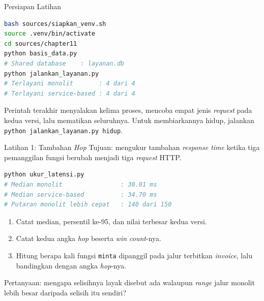 \documentclass[aspectratio=169, table, 12pt]{beamer}
\begin{document}
\begin{frame}[fragile]{{\Large Persiapan Latihan}}
  \vspace{5pt}
\begin{lstlisting}[language=bash]
bash sources/siapkan_venv.sh
source .venv/bin/activate
cd sources/chapter11
python basis_data.py
# Shared database    : layanan.db
python jalankan_layanan.py
# Terlayani monolit       : 4 dari 4
# Terlayani service-based : 4 dari 4
\end{lstlisting}

  \vspace{6pt}
  {\small Perintah terakhir menyalakan kelima proses, mencoba empat jenis
  \textit{request} pada kedua versi, lalu mematikan seluruhnya. Untuk membiarkannya
  hidup, jalankan \texttt{python jalankan\_layanan.py hidup}.}
\end{frame}

\begin{frame}[fragile]{{\Large Latihan 1: Tambahan \textit{Hop}}}
  \vspace{16pt}
  {\small Tujuan: mengukur tambahan \textit{response time} ketika tiga
  pemanggilan fungsi berubah menjadi tiga \textit{request} HTTP.}
\begin{lstlisting}[language=bash]
python ukur_latensi.py
# Median monolit                : 30.01 ms
# Median service-based          : 34.70 ms
# Putaran monolit lebih cepat   : 140 dari 150
\end{lstlisting}

  \begin{enumerate}\small
    \item Catat median, persentil ke-95, dan nilai terbesar kedua versi.
    \item Catat kedua angka \textit{hop} beserta \textit{win count}-nya.
    \item Hitung berapa kali fungsi \texttt{minta} dipanggil pada jalur
          terbitkan \textit{invoice}, lalu bandingkan dengan angka \textit{hop}-nya.
  \end{enumerate}

  {\small Pertanyaan: mengapa selisihnya layak disebut ada walaupun
  \textit{range} jalur monolit lebih besar daripada selisih itu sendiri?}
\end{frame}
\end{document}
